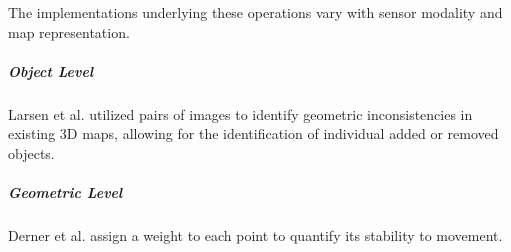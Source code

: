 The implementations underlying these operations vary with sensor modality and map representation. 




\subparagraph{Object Level}
Larsen et al. \cite{larsenChangeDetectionModel} utilized pairs of images to identify geometric inconsistencies in existing 3D maps, allowing for the identification of individual added or removed objects.

\subparagraph{Geometric Level}
Derner et al. \cite{dernerChangeDetectionUsing2021} assign a weight to each point to quantify its stability to movement.




